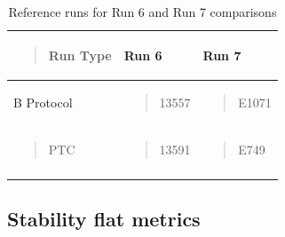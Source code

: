 \begin{longtable}[H]{@{}
  >{\raggedright\arraybackslash}p{}
  >{\raggedright\arraybackslash}p{}
  >{\raggedright\arraybackslash}p{}@{}}
\toprule\noalign{}
\label{runTable-b-ptc}
\begin{minipage}[b]{\linewidth}\raggedright
\begin{quote}
Run Type
\end{quote}
\end{minipage} & \begin{minipage}[b]{\linewidth}\raggedright
Run 6
\end{minipage} & \begin{minipage}[b]{\linewidth}\raggedright
Run 7
\end{minipage} \\
\midrule\noalign{}
\endhead
\bottomrule\noalign{}
\endlastfoot
B Protocol & \begin{minipage}[t]{\linewidth}\raggedright
\begin{quote}
13557
\end{quote}
\end{minipage} & \begin{minipage}[t]{\linewidth}\raggedright
\begin{quote}
E1071
\end{quote}
\end{minipage} \\
\begin{minipage}[t]{\linewidth}\raggedright
\begin{quote}
PTC
\end{quote}
\end{minipage} & \begin{minipage}[t]{\linewidth}\raggedright
\begin{quote}
13591
\end{quote}
\end{minipage} & \begin{minipage}[t]{\linewidth}\raggedright
\begin{quote}
E749
\end{quote}
\end{minipage} \\
\caption{Reference runs for Run 6 and Run 7 comparisons}
\end{longtable}

\subsection{Stability flat metrics}\label{stability-flat-metrics}

